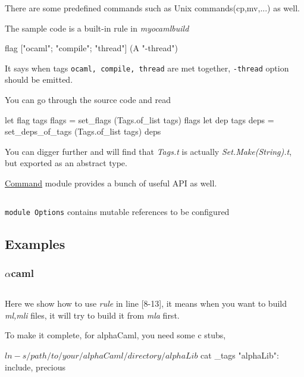 There are some predefined commands such as Unix commands(cp,mv,...) as
well.


The sample code is a built-in rule in \textit{myocamlbuild}

\begin{ocamlcode}
flag ["ocaml"; "compile"; "thread"] (A "-thread")  
\end{ocamlcode}

It says when tags \verb|ocaml, compile, thread| are met together,
\verb|-thread| option should be emitted.

You can go through the source code and read

\begin{ocamlcode}
  let flag tags flags = set_flags (Tags.of_list tags) flags
  let dep tags deps = set_deps_of_tags (Tags.of_list tags) deps  
\end{ocamlcode}
You can digger further and will find that \textit{Tags.t} is actually
\textit{Set.Make(String).t}, but exported as an abstract type.

\href{http://www.seas.upenn.edu/~hongboz/hongbo_zhang_files/ob/Command.html}{Command}
module provides a bunch of useful API as well.

\inputminted[fontsize=\scriptsize]{ocaml}{code/ocamlbuild/command_intf.ml}

\verb|module Options| contains mutable references to be configured

\subsection{Examples}

\subsubsection{$\alpha$caml}

\inputminted[fontsize=\scriptsize,linenos=true]{ocaml}{code/ocamlbuild/alphacaml.ml}

Here we show how to use \textit{rule} in line [8-13], it means when
you want to build \textit{ml,mli} files, it will try to build it from
\textit{mla} first.

To make it complete, for alphaCaml, you need some c stubs,

\begin{bashcode}
  $ ln -s /path/to/your/alphaCaml/directory/ alphaLib
  $ cat _tags
  "alphaLib": include, precious
\end{bashcode}

